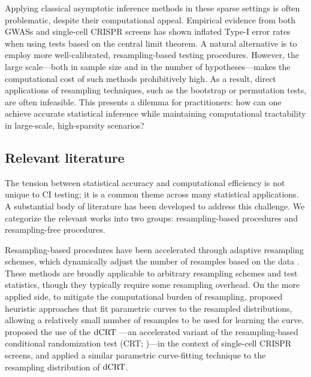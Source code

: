 \documentclass[12pt]{article}
\theoremstyle{definition}
\newcommand{\dCRT}{\textnormal{dCRT}} 					%
\begin{document}
  Applying classical asymptotic inference methods in these sparse settings is often problematic, despite their computational appeal. Empirical evidence from both GWASs \citep{dey2017fast} and single-cell CRISPR screens \citep{Barry2024} has shown inflated Type-I error rates when using tests based on the central limit theorem. A natural alternative is to employ more well-calibrated, resampling-based testing procedures. However, the large scale—both in sample size and in the number of hypotheses—makes the computational cost of such methods prohibitively high. As a result, direct applications of resampling techniques, such as the bootstrap or permutation tests, are often infeasible. This presents a dilemma for practitioners: how can one achieve accurate statistical inference while maintaining computational tractability in large-scale, high-sparsity scenarios?
  
  \subsection{Relevant literature}
  
  The tension between statistical accuracy and computational efficiency is not unique to CI testing; it is a common theme across many statistical applications. A substantial body of literature has been developed to address this challenge. We categorize the relevant works into two groups: resampling-based procedures and resampling-free procedures.
  
  Resampling-based procedures have been accelerated through adaptive resampling schemes, which dynamically adjust the number of resamples based on the data \citep{Besag1991,Gandy2009,Gandy2014,Gandy2016,Gandy2017a,Fischer2024a,Fischer2024}. These methods are broadly applicable to arbitrary resampling schemes and test statistics, though they typically require some resampling overhead. On the more applied side, to mitigate the computational burden of resampling, \citet{Ge2012,Winkler2016} proposed heuristic approaches that fit parametric curves to the resampled distributions, allowing a relatively small number of resamples to be used for learning the curve. \citet{Katsevich2020c} proposed the use of the $\dCRT$ \citep{Liu2022a}—an accelerated variant of the resampling-based conditional randomization test (CRT; \cite{CetL16})—in the context of single-cell CRISPR screens, and applied a similar parametric curve-fitting technique to the resampling distribution of $\dCRT$.
  
\end{document}
